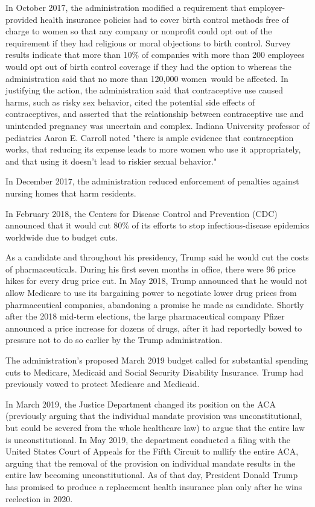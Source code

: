 In October 2017, the administration modified a requirement that
employer-provided health insurance policies had to cover birth control
methods free of charge to women so that any company or nonprofit could
opt out of the requirement if they had religious or moral objections to
birth control. Survey results indicate that more than 10\% of companies
with more than 200 employees would opt out of birth control coverage if
they had the option to whereas the administration said that no more than
120,000 women~would be affected. In justifying the action, the
administration said that contraceptive use caused harms, such as risky
sex behavior, cited the potential side effects of contraceptives, and
asserted that the relationship between contraceptive use and unintended
pregnancy was uncertain and complex. Indiana University professor of
pediatrics Aaron E. Carroll noted "there is ample evidence that
contraception works, that reducing its expense leads to more women who
use it appropriately, and that using it doesn't lead to riskier sexual
behavior."

In December 2017, the administration reduced enforcement of penalties
against nursing homes that harm residents.

In February 2018, the Centers for Disease Control and Prevention (CDC)
announced that it would cut 80\% of its efforts to stop
infectious-disease epidemics worldwide due to budget cuts.

As a candidate and throughout his presidency, Trump said he would cut
the costs of pharmaceuticals. During his first seven months in office,
there were 96 price hikes for every drug price cut. In May 2018, Trump
announced that he would not allow Medicare to use its bargaining power
to negotiate lower drug prices from pharmaceutical companies, abandoning
a promise he made as candidate. Shortly after the 2018 mid-term
elections, the large pharmaceutical company Pfizer announced a price
increase for dozens of drugs, after it had reportedly bowed to pressure
not to do so earlier by the Trump administration.

The administration's proposed March 2019 budget called for substantial
spending cuts to Medicare, Medicaid and Social Security Disability
Insurance. Trump had previously vowed to protect Medicare and Medicaid.

In March 2019, the Justice Department changed its position on the ACA
(previously arguing that the individual mandate provision was
unconstitutional, but could be severed from the whole healthcare law) to
argue that the entire law is unconstitutional. In May 2019, the
department conducted a filing with the United States Court of Appeals
for the Fifth Circuit to nullify the entire ACA, arguing that the
removal of the provision on individual mandate results in the entire law
becoming unconstitutional. As of that day, President Donald Trump has
promised to produce a replacement health insurance plan only after he
wins reelection in 2020.

